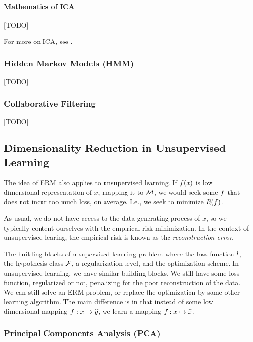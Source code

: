 \paragraph{Mathematics of ICA}
[TODO]

For more on ICA, see \cite{hyvarinen_independent_2000}. 


\subsubsection{Hidden Markov Models (HMM)}
\label{sec:hmm}
[TODO]


\subsubsection{Collaborative Filtering}
\label{sec:collaborative_filtering}
[TODO]



\subsection{Dimensionality Reduction in Unsupervised Learning}
\label{sec:dim_reduce_unsupervised}

The idea of ERM also applies to unsupervised learning.
If $f(x)$ is low dimensional representation of $x$, mapping it to $\mathcal{M}$, we would seek some $f$ that does not incur too much loss, on average. I.e., we seek to minimize $R(f)$.

As usual, we do not have access to the data generating process of $x$, so we typically content ourselves with the empirical risk minimization.
In the context of unsupervised learing, the empirical risk is known as the \emph{reconstruction error}.

The building blocks of a supervised learning problem where the loss function $l$, the hypothesis class $\mathcal{F}$, a regularization level, and the optimization scheme.
In unsupervised learning, we have similar building blocks. We still have some loss function, regularized or not, penalizing for the poor reconstruction of the data. We can still solve an ERM problem, or replace the optimization by some other learning algorithm. The main difference is in that instead of some low dimensional mapping $f:x \mapsto \widehat{y}$, we learn a mapping  $f:x \mapsto \widehat{x}$.





\subsubsection{Principal Components Analysis (PCA)}
\label{sec:pca}

